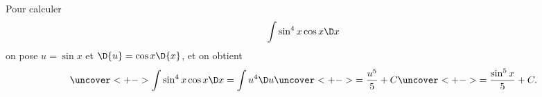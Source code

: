 


\begin{frame}
  \begin{example}
    Pour calculer
    \begin{equation*}
      \int \sin^4 x \cos x \D x
    \end{equation*}\pause{}
    on pose $u = \sin x$ et \(\D{u} = \cos x \D{x}\),\pause{} et on obtient
    \begin{equation*}
      \uncover<+->{\int \sin^4 x \cos x \D x = \int u^4 \D u}
      \uncover<+->{= \frac{u^5}{5} + C }
      \uncover<+->{= \frac{\sin^5 x}{5} + C.}
    \end{equation*}
  \end{example}
\end{frame}

